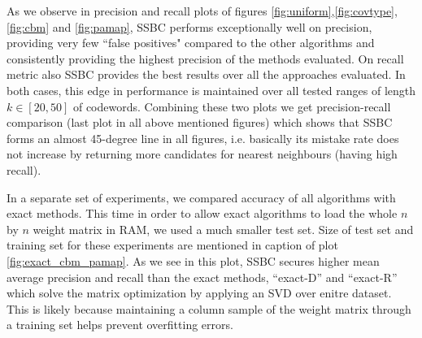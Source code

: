 \documentclass{sig-alternate}
\begin{document}
As we observe in precision and recall plots of figures \ref{fig:uniform},\ref{fig:covtype},\ref{fig:cbm} and \ref{fig:pamap}, SSBC performs exceptionally well on precision, providing very few ``false positives" compared to the other algorithms and consistently providing the highest precision of the methods evaluated. 
On recall metric also SSBC provides the best results over all the approaches evaluated. In both cases, this edge in performance is maintained over all tested ranges of length $k \in [20,50]$ of codewords. Combining these two plots we get precision-recall comparison (last plot in all above mentioned figures) which shows that SSBC forms an almost 45-degree line in all figures, i.e. basically its mistake rate does not increase by returning more candidates for nearest neighbours (having high recall).

In a separate set of experiments, we compared accuracy of all algorithms with exact methods. This time in order to allow exact algorithms to load the whole $n$ by $n$ weight matrix in RAM, we used a much smaller test set. Size of test set and training set for these experiments are mentioned in caption of plot \ref{fig:exact_cbm_pamap}.
As we see in this plot, SSBC secures higher mean average precision and recall than the exact methods, ``exact-D'' and ``exact-R'' which solve the matrix optimization by applying an SVD over enitre dataset. This is likely because maintaining a column sample of the weight matrix through a training set helps prevent overfitting errors.


  
\end{document}
